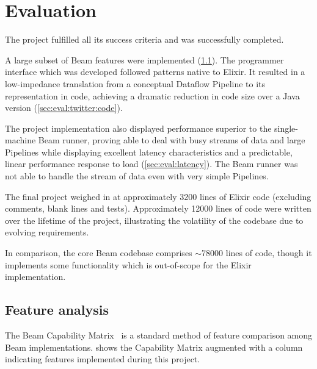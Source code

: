 \chapter{Evaluation}\label{ch:eval}
\label{sec:eval:overall}

The project fulfilled all its success criteria and was successfully completed.

A large subset of Beam features were implemented (\cref{sec:eval:limitations}).
The programmer interface which was developed followed patterns native to Elixir.
It resulted in a low-impedance translation from a conceptual Dataflow Pipeline to its representation in code, achieving a dramatic reduction in code size over a Java version (\cref{sec:eval:twitter:code}).

The project implementation also displayed performance superior to the single-machine Beam runner, proving able to deal with busy streams of data and large Pipelines while displaying excellent latency characteristics and a predictable, linear performance response to load (\cref{sec:eval:latency}).
The Beam runner was not able to handle the stream of data even with very simple Pipelines.

The final project weighed in at approximately \num{3200} lines of Elixir code (excluding comments, blank lines and tests).
Approximately \num{12000} lines of code were written over the lifetime of the project, illustrating the volatility of the codebase due to evolving requirements.

In comparison, the core Beam codebase comprises $\sim$\num{78000} lines of code, though it implements some functionality which is out-of-scope for the Elixir implementation.

\section{Feature analysis}\label{sec:eval:limitations}

The Beam Capability Matrix~\cite{Beam-Cap-Matrix} is a standard method of feature comparison among Beam implementations.
 shows the Capability Matrix augmented with a column indicating features implemented during this project.

